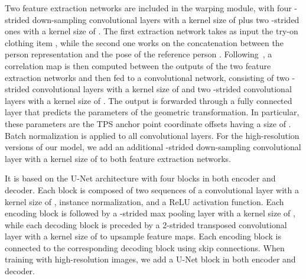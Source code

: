 \begin{table}[t]
\centering
\footnotesize
\caption{Number of train and test pairs for each category of the Dress Code dataset.}
\label{tab:stats}
\vspace{-0.4cm}
\end{table}

 Two feature extraction networks are included in the warping module, with four -strided down-sampling convolutional layers with a kernel size of  plus two -strided ones with a kernel size of . The first extraction network takes as input the try-on clothing item , while the second one works on the concatenation between the person representation  and the pose of the reference person . Following~\cite{wang2018toward}, a correlation map is then computed between the outputs of the two feature extraction networks and then fed to a convolutional network, consisting of two -strided convolutional layers with a kernel size of  and two -strided convolutional layers with a kernel size of . The output is forwarded through a fully connected layer that predicts the parameters of the geometric transformation. In particular, these parameters are the TPS anchor point coordinate offsets having a size of . Batch normalization is applied to all convolutional layers. For the high-resolution versions of our model, we add an additional -strided down-sampling convolutional layer with a kernel size of  to both feature extraction networks.

It is based on the U-Net architecture with four blocks in both encoder and decoder. Each block is composed of two sequences of a convolutional layer with a kernel size of , instance normalization, and a ReLU activation function. Each encoding block is followed by a -strided max pooling layer with a kernel size of , while each decoding block is preceded by a 2-strided transposed convolutional layer with a kernel size of  to upsample feature maps. Each encoding block is connected to the corresponding decoding block using skip connections. When training with high-resolution images, we add a U-Net block in both encoder and decoder.

